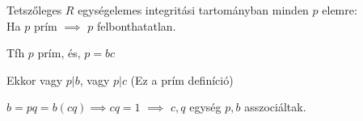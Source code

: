 \begin{frame}
\begin{tcolorbox}[title={Tétel: Prím és irreducibilis elem EIT-ban}]
Tetszőleges $R$ egységelemes integritási tartományban minden $p$ elemre:\\
Ha $p$ prím $\implies$ $p$ felbonthatatlan.
\tcblower
{}\\
\mmedskip

Tfh $p$ prím, és, $p = bc$\\
\msmallskip

Ekkor vagy $p|b$, vagy $p|c$ (Ez a prím definíció)\\
\msmallskip

$b = pq = b(cq) \implies cq = 1$ $\implies$ $c, q$ egység $p, b$ asszociáltak.
\end{tcolorbox}
\end{frame}

